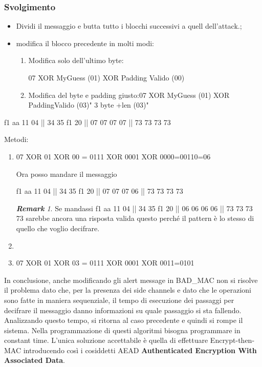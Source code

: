 \documentclass{book}
\theoremstyle{remark}
\newtheorem*{remark}{\textbf{Remark}}
\begin{document}
\subsubsection{Svolgimento}
\begin{itemize}
	\item Dividi il messaggio  e butta tutto i blocchi successivi a quell dell'attack\@.;\@
	\item modifica il blocco precedente in molti modi:\begin{enumerate}
		      \item Modifica solo dell'ultimo byte:\begin{center}
			            07 XOR MyGuess (01) XOR Padding Valido (00)
		            \end{center}
		      \item Modifica del byte e padding giusto:\@07 XOR MyGuess (01) XOR PaddingValido (03)" 3 byte +len (03)"
	      \end{enumerate}
\end{itemize}
\begin{center}
	f1 aa 11 04 || 34 35 f1 20 || 07 07 07 07 || 73 73 73 73
\end{center}
Metodi:\begin{enumerate} 
	\item \begin{center}
		      07 XOR 01 XOR 00 = 0111 XOR 0001 XOR 0000=00110=06
	      \end{center}
	      Ora posso mandare il messaggio\begin{center}
		      f1 aa 11 04 || 34 35 f1 20 || 07 07 07 06 || 73 73 73 73
		      \begin{remark}
			      Se mandassi  f1 aa 11 04 || 34 35 f1 20 || 06 06 06 06 || 73 73 73 73 sarebbe ancora una risposta valida questo perché il pattern è lo stesso di quello che voglio decifrare\@.
		      \end{remark}\end{center}
	\item \item \begin{center}
		      07 XOR 01 XOR 03 = 0111 XOR 0001 XOR 0011=0101
	      \end{center}
\end{enumerate}
In conclusione, anche modificando gli alert message in BAD\_MAC non si risolve il problema dato che, per la presenza dei side channels e dato che le operazioni sono fatte in maniera sequenziale, il tempo di esecuzione dei passaggi per decifrare il messaggio danno informazioni su quale passaggio si sta fallendo\@. Analizzando questo tempo, si ritorna al caso precedente e quindi si rompe il sistema\@. Nella programmazione di questi algoritmi bisogna programmare in constant time\@.
L'unica soluzione accettabile è quella di effettuare Encrypt-then-MAC introducendo così i cosiddetti AEAD\textbf{ Authenticated Encryption With Associated Data}\@.
\end{document}
